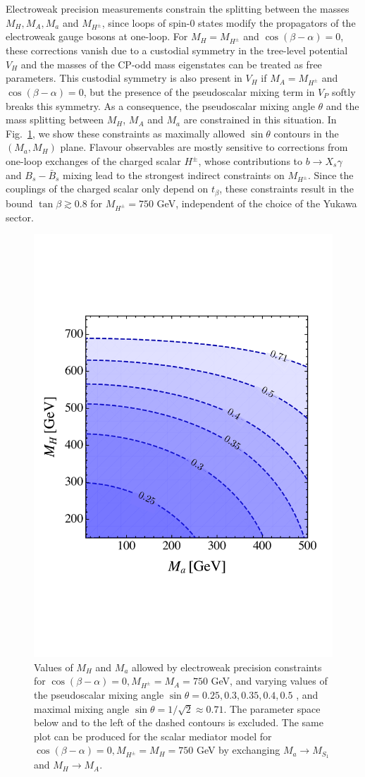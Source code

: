 Electroweak precision measurements constrain the splitting between the masses $M_H, M_A, M_a$ and $M_{H^\pm}$, since loops of spin-0 states modify the propagators of the electroweak gauge bosons at one-loop. For $M_H=M_{H^\pm}$ and $\cos(\beta-\alpha)=0$, these corrections vanish due to a custodial symmetry in the tree-level potential $V_H$ \cite{} and the masses of the CP-odd mass eigenstates can be treated as free parameters. This custodial symmetry is also present in $V_H$ if $M_A=M_{H^\pm}$ and $\cos(\beta-\alpha)=0$, but the presence of the pseudoscalar mixing term in $V_P$ softly breaks this symmetry. As a consequence, the pseudoscalar mixing angle $\theta$ and the mass splitting between $M_H$, $M_A$ and $M_a$ are constrained in this situation. In Fig.~\ref{fig:EWPM}, we show these constraints as maximally allowed $\sin \theta$ contours in the $(M_a, M_H)$ plane.
Flavour observables are mostly sensitive to corrections from one-loop exchanges of the charged scalar ${H^\pm}$, whose contributions to $b \to X_s \gamma$ \cite{Hermann:2012fc,Misiak:2015xwa,Czakon:2015exa} and $B_s-\bar B_s$ mixing \cite{Abbott:1979dt,Geng:1988bq,Buras:1989ui,Eberhardt:2013uba} lead to the strongest indirect constraints on $M_{H^\pm}$. Since the couplings of the charged scalar only depend on $t_\beta$, these constraints result in the bound $\tan \beta \gtrsim 0.8$ for $M_{H^\pm}=750$ GeV, independent of the choice of the Yukawa sector.\\
\begin{figure}[t]
\centering
\includegraphics[width=.5\textwidth]{Figs/EWPM}
\caption{\label{fig:EWPM}Values of $M_H$ and $M_a$ allowed by electroweak precision constraints for $\cos(\beta-\alpha)=0, M_{H^\pm}=M_A=750$ GeV, and varying values of the pseudoscalar mixing angle $\sin \theta =0.25, 0.3, 0.35, 0.4, 0.5$ , and maximal mixing angle $\sin\theta =1/\sqrt{2}\approx 0.71$. The parameter space below and to the left of the dashed contours is excluded. The same plot can be produced for the scalar mediator model for $\cos(\beta-\alpha)=0, M_{H^\pm}=M_H=750$ GeV by exchanging $M_a\rightarrow M_{S_1}$ and $M_H\rightarrow M_{A}$. }
\end{figure}
